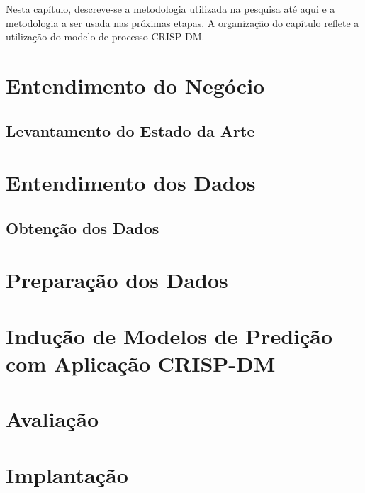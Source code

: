 Nesta capítulo, descreve-se a metodologia utilizada na pesquisa até aqui e a
metodologia a ser usada nas próximas etapas. A organização do capítulo reflete a
utilização do modelo de processo CRISP-DM.

\section{Entendimento do Negócio}
\subsection{Levantamento do Estado da Arte}

\section{Entendimento dos Dados}
\subsection{Obtenção dos Dados}

\section{Preparação dos Dados}

\section{Indução de Modelos de Predição com Aplicação CRISP-DM}

\section{Avaliação}

\section{Implantação}
